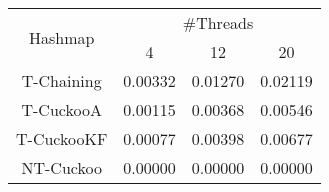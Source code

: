 \begin{tabular}{|c|c|c|c|}
\hline
\multirow{2}{*}{Hashmap} & \multicolumn{3}{c|}{\#Threads}\\\cline{2-4}& 4 & 12 & 20\\
\hline
\hline
T-Chaining & 0.00332 & 0.01270 & 0.02119\\
T-CuckooA & 0.00115 & 0.00368 & 0.00546\\
T-CuckooKF & 0.00077 & 0.00398 & 0.00677\\
NT-Cuckoo & 0.00000 & 0.00000 & 0.00000\\
\hline
\end{tabular}
